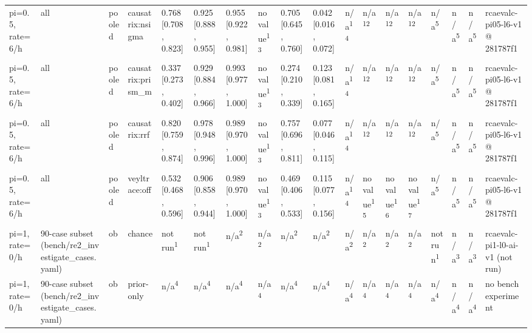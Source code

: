 \begin{table}[t]
\begin{tabular}{llllllllllllllllll}
pi=0.5, rate=6/h & all & pooled & causatrix:nsigma & 0.768 [0.708, 0.823] & 0.925 [0.888, 0.955] & 0.955 [0.922, 0.981] & no value\textsuperscript{13} & 0.705 [0.645, 0.760] & 0.042 [0.016, 0.072] & n/a\textsuperscript{14} & n/a\textsuperscript{12} & n/a\textsuperscript{12} & n/a\textsuperscript{12} & n/a\textsuperscript{5} & n/a\textsuperscript{5} & n/a\textsuperscript{5} & rcaevalc-pi05-l6-v1 @ 281787f1 \\
pi=0.5, rate=6/h & all & pooled & causatrix:prism\_m & 0.337 [0.273, 0.402] & 0.929 [0.884, 0.966] & 0.993 [0.977, 1.000] & no value\textsuperscript{13} & 0.274 [0.210, 0.339] & 0.123 [0.081, 0.165] & n/a\textsuperscript{14} & n/a\textsuperscript{12} & n/a\textsuperscript{12} & n/a\textsuperscript{12} & n/a\textsuperscript{5} & n/a\textsuperscript{5} & n/a\textsuperscript{5} & rcaevalc-pi05-l6-v1 @ 281787f1 \\
pi=0.5, rate=6/h & all & pooled & causatrix:rrf & 0.820 [0.759, 0.874] & 0.978 [0.948, 0.996] & 0.989 [0.970, 1.000] & no value\textsuperscript{13} & 0.757 [0.696, 0.811] & 0.077 [0.046, 0.115] & n/a\textsuperscript{14} & n/a\textsuperscript{12} & n/a\textsuperscript{12} & n/a\textsuperscript{12} & n/a\textsuperscript{5} & n/a\textsuperscript{5} & n/a\textsuperscript{5} & rcaevalc-pi05-l6-v1 @ 281787f1 \\
pi=0.5, rate=6/h & all & pooled & veyltrace:off & 0.532 [0.468, 0.596] & 0.906 [0.858, 0.944] & 0.989 [0.970, 1.000] & no value\textsuperscript{13} & 0.469 [0.406, 0.533] & 0.115 [0.077, 0.156] & n/a\textsuperscript{14} & no value\textsuperscript{15} & no value\textsuperscript{16} & no value\textsuperscript{17} & n/a\textsuperscript{5} & n/a\textsuperscript{5} & n/a\textsuperscript{5} & rcaevalc-pi05-l6-v1 @ 281787f1 \\
pi=1, rate=0/h & 90-case subset (bench/re2\_investigate\_cases.yaml) & ob & chance & not run\textsuperscript{1} & not run\textsuperscript{1} & n/a\textsuperscript{2} & n/a\textsuperscript{2} & n/a\textsuperscript{2} & n/a\textsuperscript{2} & n/a\textsuperscript{2} & n/a\textsuperscript{2} & n/a\textsuperscript{2} & n/a\textsuperscript{2} & not run\textsuperscript{1} & n/a\textsuperscript{3} & n/a\textsuperscript{3} & rcaevalc-pi1-l0-ai-v1 (not run) \\
pi=1, rate=0/h & 90-case subset (bench/re2\_investigate\_cases.yaml) & ob & prior-only & n/a\textsuperscript{4} & n/a\textsuperscript{4} & n/a\textsuperscript{4} & n/a\textsuperscript{4} & n/a\textsuperscript{4} & n/a\textsuperscript{4} & n/a\textsuperscript{4} & n/a\textsuperscript{4} & n/a\textsuperscript{4} & n/a\textsuperscript{4} & n/a\textsuperscript{4} & n/a\textsuperscript{4} & n/a\textsuperscript{4} & no bench experiment \\

\end{tabular}
\end{table}
